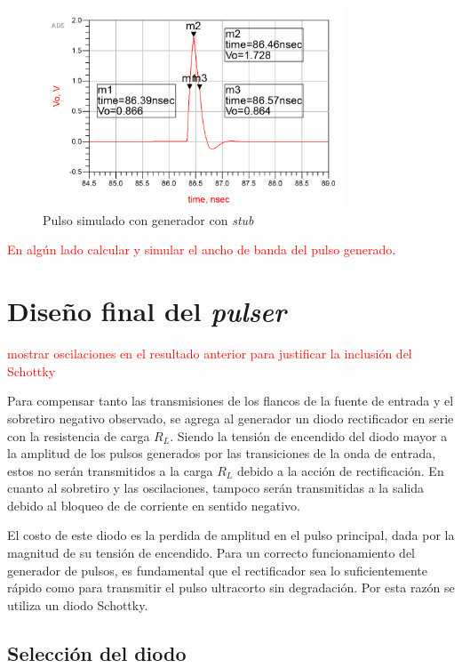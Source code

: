 \begin{figure}[tbp]
    \centering
    \includegraphics[width=0.8\textwidth]{images/stub_generator_result_pulse.png}
    \caption{Pulso simulado con generador con \textit{stub}}
    \label{fig:stub_generator_result_pulse}
\end{figure}

\textcolor{red}{En algún lado calcular y simular el ancho de banda del pulso
generado}.

\section{Diseño final del \textit{pulser}}

\textcolor{red}{mostrar oscilaciones en el resultado anterior para justificar la
inclusión del Schottky}

Para compensar tanto las transmisiones de los flancos de la fuente de entrada y
el sobretiro negativo observado, se agrega al generador un diodo rectificador en
serie con la resistencia de carga $R_L$. Siendo la tensión de encendido del
diodo mayor a la amplitud de los pulsos generados por las transiciones de la
onda de entrada, estos no serán transmitidos a la carga $R_L$ debido a la acción
de rectificación. En cuanto al sobretiro y las oscilaciones, tampoco serán
transmitidas a la salida debido al bloqueo de de corriente en sentido negativo.

El costo de este diodo es la perdida de amplitud en el pulso principal, dada por la
magnitud de su tensión de encendido. Para un correcto funcionamiento del
generador de pulsos, es fundamental que el rectificador sea lo suficientemente
rápido como para transmitir el pulso ultracorto sin degradación. Por esta razón
se utiliza un diodo Schottky.

\subsection{Selección del diodo}

